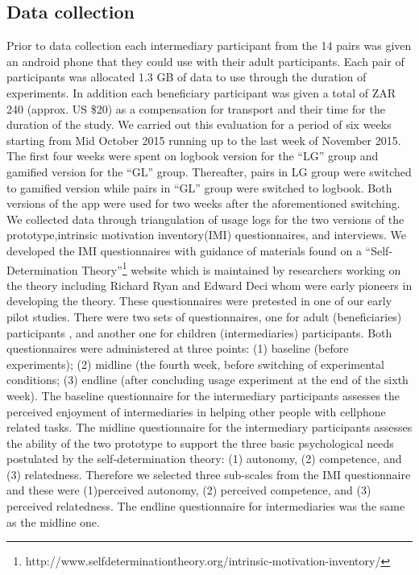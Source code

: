 \documentclass{sig-alternate}
\begin{document}
\subsection{Data collection} 
Prior to data collection each intermediary participant from the 14 pairs was given an android phone that they could use with their adult participants. Each pair of participants was allocated 1.3 GB of data to use through the duration of experiments. In addition each beneficiary participant was given a total of ZAR 240 (approx. US \$20) as a compensation for transport and their time for the duration of the study.\newline
We carried out this evaluation for a period of six weeks starting from Mid October 2015 running up to the last week of November 2015. The first four weeks were spent on logbook version for the ``LG'' group and  gamified version for the ``GL'' group. Thereafter, pairs in LG group were switched to gamified version while pairs in ``GL'' group were switched to logbook. Both versions of the app were used for two weeks after the aforementioned switching.\newline
We collected data through triangulation of usage logs for the two versions of the prototype,intrinsic motivation inventory(IMI) questionnaires, and interviews. We developed the IMI questionnaires with guidance of materials found on a ``Self-Determination Theory''\footnote{http://www.selfdeterminationtheory.org/intrinsic-motivation-inventory/} website which is maintained by researchers working on the theory including Richard Ryan and Edward Deci\cite{deci1985intrinsic} whom were early pioneers in developing the theory. These questionnaires were pretested in one of our early pilot studies.\newline
There were two sets of questionnaires, one for adult (beneficiaries) participants , and another one for children (intermediaries)  participants. Both questionnaires were administered at three points: (1) baseline (before experiments); (2) midline (the fourth week, before switching of experimental conditions; (3) endline (after concluding usage experiment at the end of the sixth week).\newline
The baseline questionnaire for the intermediary participants assesses the perceived enjoyment of intermediaries in helping other people with cellphone related tasks. The midline questionnaire for the intermediary participants assesses the ability of the two prototype to support the three basic psychological needs postulated by the self-determination theory: (1) autonomy, (2) competence, and (3) relatedness. Therefore we selected three sub-scales from the IMI questionnaire and these were (1)perceived autonomy, (2) perceived competence, and (3) perceived relatedness. The endline questionnaire for intermediaries was the same as the midline one.\newline
\end{document}

